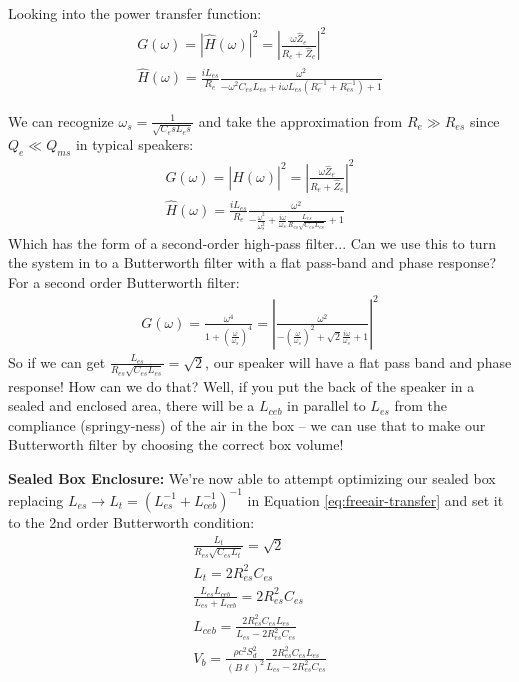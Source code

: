 \documentclass[10pt,letterpaper]{article}
\begin{document}
Looking into the power transfer function:
\begin{align}
G(\omega)=\left| \hat{H}(\omega)\right|^2 =\left| \frac{\omega  \hat{Z}_e }{ R_e+\hat{Z}_e} \right|^2\\
\hat{H}(\omega) =\frac{i L_{es}}{R_e}\frac{\omega^2}{-\omega^2 C_{es}L_{es}+i\omega L_{es}\left( R_e^{-1}+R_{es}^{-1} \right) +1}
\end{align}

We can recognize $\omega_s=\frac{1}{\sqrt{C_es L_es}}$ and take the approximation from $R_e\gg R_{es}$ since $Q_e\ll Q_{ms}$ in typical speakers:
\begin{align}
G(\omega)=\left| \hat{H}(\omega)\right|^2 =\left| \frac{\omega  \hat{Z}_e }{ R_e+\hat{Z}_e} \right|^2\\
\hat{H}(\omega) =\frac{i L_{es}}{R_e}\frac{\omega^2}{-\frac{\omega^2}{\omega_s^2} +\frac{i \omega}{\omega_s}\frac{ L_{es}}{R_{es}\sqrt{C_{es}L_{es}} } +1}\label{eq:freeair-transfer}
\end{align}
Which has the form of a second-order high-pass filter... Can we use this to turn the system in to a Butterworth filter with a flat pass-band and phase response? For a second order Butterworth filter:
\begin{align}
G(\omega)=\frac{\omega^4}{1+\left( \frac{\omega}{\omega_s} \right)^4}=\left| \frac{\omega^2}{-\left(\frac{\omega}{\omega_s} \right)^2 +\sqrt{2}\frac{i\omega}{\omega_s} +1} \right|^2
\end{align}
So if we can get $\frac{ L_{es}}{R_{es}\sqrt{C_{es}L_{es}}} =\sqrt{2}$, our speaker will have a flat pass band and phase response! How can we do that? Well, if you put the back of the speaker in a sealed and enclosed area, there will be a $L_{ceb}$ in parallel to $L_{es}$ from the compliance (springy-ness) of the air in the box -- we can use that to make our Butterworth filter by choosing the correct box volume!

\textbf{Sealed Box Enclosure:} We're now able to attempt optimizing our sealed box replacing $L_{es}\rightarrow L_t=\left(L_{es}^{-1}+L_{ceb}^{-1}\right)^{-1}$ in Equation \ref{eq:freeair-transfer} and set it to the 2nd order Butterworth condition:
\begin{align}
\frac{ L_{t}}{R_{es}\sqrt{C_{es}L_{t}} } =\sqrt{2}\\
L_t=2R_{es}^2C_{es}\\
\frac{L_{es}L_{ceb}}{L_{es}+L_{ceb}}=2R_{es}^2C_{es}\\
L_{ceb}=\frac{2R_{es}^2C_{es}L_{es}}{L_{es}-2R_{es}^2C_{es}}\\
V_b=\frac{\rho c^2 S_d^2}{(B\ell)^2}\frac{2R_{es}^2C_{es}L_{es}}{L_{es}-2R_{es}^2C_{es}}
\end{align}
\end{document}
